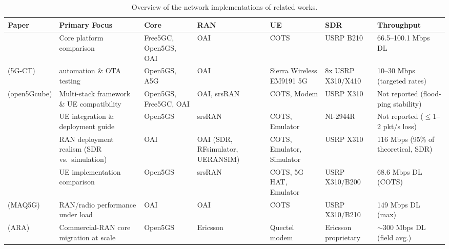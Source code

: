 \begin{landscape}
\begin{table}[p]
\centering
\renewcommand{\arraystretch}{1.3}
\begin{tabularx}{\linewidth}{|>{\raggedright\arraybackslash}p{2.5cm}|Y|>{\raggedright\arraybackslash}p{2.6cm}|>{\raggedright\arraybackslash}p{2.5cm}|>{\raggedright\arraybackslash}p{2.6cm}|>{\raggedright\arraybackslash}p{2.6cm}|Y|}
\hline
{}
\textbf{Paper} & \textbf{Primary Focus} & \textbf{Core} & \textbf{RAN} & \textbf{UE} & \textbf{SDR} & \textbf{Throughput} \\ \hline
\cite{barbosa2025opensource} & Core platform comparison & Free5GC, Open5GS, \gls{OAI} & \gls{OAI} & \gls{COTS} & USRP B210 & 66.5--100.1 Mbps DL \\ \hline
\cite{bonati2025_5gct}\newline(5G-CT) &  automation \& \gls{OTA} testing & Open5GS, A5G & \gls{OAI} & Sierra Wireless EM9191 5G & 8x USRP X310/X410 & 10--30 Mbps (targeted rates) \\ \hline
\cite{horstmann2025open5gcube}\newline(open5Gcube) & Multi-stack framework \& \gls{UE} compatibility & Open5GS, Free5GC, \gls{OAI} & \gls{OAI}, srsRAN & \gls{COTS}, Modem & USRP X310 & Not reported (flood-ping stability) \\ \hline
\cite{mamushiane2023deploying} & \gls{UE} integration \& deployment guide & Open5GS & srsRAN & \gls{COTS}, Emulator & NI-2944R & Not reported ($\leq$1--2 pkt/s loss) \\ \hline
\cite{rouili2024evaluating} & \gls{RAN} deployment realism (\gls{SDR} vs.\ simulation) & \gls{OAI} & \gls{OAI} (\gls{SDR}, RFsimulator, UERANSIM) & \gls{COTS}, Emulator, Simulator & USRP X310 & 116 Mbps (95\% of theoretical, \gls{SDR}) \\ \hline
\cite{tio2025exploring5g} & \gls{UE} implementation comparison & Open5GS & srsRAN & \gls{COTS}, 5G HAT, Emulator & USRP X310/B200 & 68.6 Mbps DL (\gls{COTS}) \\ \hline
\cite{vazquez2024maq5g}\newline(MAQ5G) & \gls{RAN}/radio performance under load & \gls{OAI} & \gls{OAI} & \gls{COTS} & USRP X310/B210 & 149 Mbps DL (max) \\ \hline
\cite{zu2025realworld}\newline(ARA) & Commercial-\gls{RAN} core migration at scale & Open5GS & Ericsson & Quectel modem & Ericsson proprietary & $\sim$300 Mbps DL (field avg.) \\ \hline
\end{tabularx}
\caption{Overview of the network implementations of related works.}
\label{tab:related_works_comparison}
\end{table}
\end{landscape}
